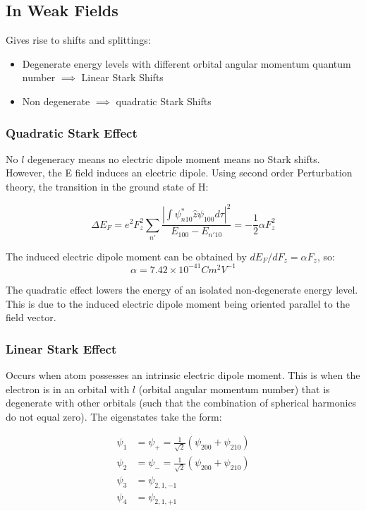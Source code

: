 \documentclass[12pt]{article}
\begin{document}
\subsection{In Weak Fields}
Gives rise to shifts and splittings:
\begin{itemize}
    \item Degenerate energy levels with different orbital angular momentum quantum number $\implies$ Linear Stark Shifts
    \item Non degenerate $\implies$ quadratic Stark Shifts
\end{itemize}

\subsubsection{Quadratic Stark Effect}
No $l$ degeneracy means no electric dipole moment means no Stark shifts. However, the E field induces an electric dipole. Using second order Perturbation theory, the transition in the ground state of H:

\[\Delta E_F = e^2 F_z^2 \sum_{n'}\frac{|\int \psi^*_{n10}\hat{z}\psi_{100}d\tau|^2}{E_{100}-E_{n'10}}=-\frac12\alpha F^2_z\]

The induced electric dipole moment can be obtained by $dE_F/dF_z=\alpha F_z$, so:
\[\alpha = 7.42\times 10^{-41}Cm^2V^{-1}\]

The quadratic effect lowers the energy of an isolated non-degenerate energy level. This is due to the induced electric dipole moment being oriented parallel to the field vector.

\subsubsection{Linear Stark Effect}

Occurs when atom possesses an intrinsic electric dipole moment. This is when the electron is in an orbital with $l$ (orbital angular momentum number) that is degenerate with other orbitals (such that the combination of spherical harmonics do not equal zero). The eigenstates take the form:

\begin{align*}
    \psi_1 &= \psi_+= \frac{1}{\sqrt{2}}(\psi_{200}+\psi_{210})\\
    \psi_2 &= \psi_- =\frac{1}{\sqrt{2}}(\psi_{200}+\psi_{210})\\
    \psi_3 &= \psi_{2,1,-1}\\
    \psi_4 &= \psi_{2,1,+1}
\end{align*}
\end{document}
